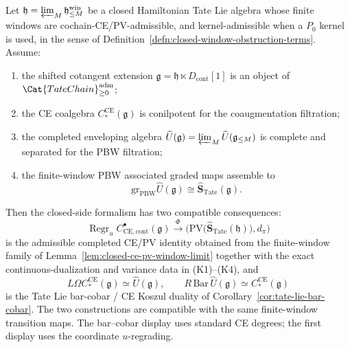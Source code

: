 \begin{lem}
\label{lem:closed-tate-koszul-formalism}
  Let \(\mathfrak h=\varprojlim_M\mathfrak h^{\mathrm{win}}_{\leq M}\) be a closed
  Hamiltonian Tate Lie algebra whose finite windows are
  cochain-CE/PV-admissible, and kernel-admissible when a \(P_0\) kernel is
  used, in the sense of
  Definition~\ref{defn:closed-window-obstruction-terms}.  Assume:
  \begin{enumerate}[label=(K\arabic*)]
    \item the shifted cotangent extension
      \(\mathfrak g=\mathfrak h\ltimes D_{\mathrm{cont}}[1]\) is an
      object of \(\Cat{TateChain}_{\geq0}^{\mathrm{adm}}\);
    \item the CE coalgebra \(C_*^{\mathrm{CE}}(\mathfrak g)\) is
      conilpotent for the coaugmentation filtration;
    \item the completed enveloping algebra
      \(\widehat U(\mathfrak g)=\varprojlim_M\widehat U(\mathfrak g_{\leq M})\)
      is complete and separated for the PBW filtration;
    \item the finite-window PBW associated graded maps assemble to
      \[
        \mathrm{gr}_{\mathrm{PBW}}\widehat U(\mathfrak g)
          \cong
        \widehat{\mathbf S}_{\mathrm{Tate}}(\mathfrak g).
      \]
  \end{enumerate}
  Then the closed-side formalism has two compatible consequences:
  \[
    \operatorname{Regr}_u
    C^\bullet_{\mathrm{CE},\mathrm{cont}}(\mathfrak g)
      \xrightarrow{\ \Phi\ }
    \bigl(
      \mathrm{PV}\bigl(\widehat{\mathbf S}_{\mathrm{Tate}}(\mathfrak h)\bigr),
      d_\pi\bigr)
  \]
  is the admissible completed CE/PV identity obtained from the
  finite-window family of Lemma~\ref{lem:closed-ce-pv-window-limit}
  together with the exact continuous-dualization and variance data in
  (K1)--(K4), and
  \[
    L\Omega C_*^{\mathrm{CE}}(\mathfrak g)
      \simeq \widehat U(\mathfrak g),\qquad
    R\,\mathrm{Bar}\,\widehat U(\mathfrak g)
      \simeq C_*^{\mathrm{CE}}(\mathfrak g)
  \]
  is the Tate Lie bar-cobar / CE Koszul duality of
  Corollary~\ref{cor:tate-lie-bar-cobar}.  The two constructions are
  compatible with the same finite-window transition maps.
  The bar--cobar display uses standard CE degrees; the first display
  uses the coordinate \(u\)-regrading.
\end{lem}

